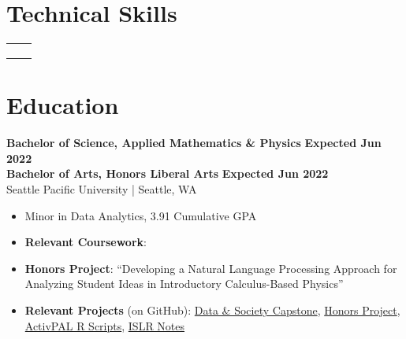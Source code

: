 \documentclass{article}
\begin{document}
\maketitle




\section{Technical Skills}
    \begin{flushleft}
        \begin{tabular}{>{\raggedleft\arraybackslash}p{1.25in} >{\raggedright\arraybackslash}p{5.85in}}
             \\
             \\
             \\
             \\
            
        \end{tabular}
    \end{flushleft}




\section{Education}

    \textbf{Bachelor of Science, Applied Mathematics \& Physics} \hfill \textbf{Expected Jun 2022}\\
    \textbf{Bachelor of Arts, Honors Liberal Arts} \hfill \textbf{Expected Jun 2022}\\
    Seattle Pacific University | Seattle, WA 
    \squish
    \begin{itemize}
        \item Minor in Data Analytics, 3.91 Cumulative GPA
        \item 
        \textbf{Relevant Coursework}: 
        \item 
        \textbf{Honors Project}: ``Developing a Natural Language Processing Approach for Analyzing Student Ideas in Introductory Calculus-Based Physics''
        \item \textbf{Relevant Projects} (on GitHub): \href{https://github.com/jonmgeiger/household-conditions}{Data \& Society Capstone}, \href{https://github.com/jonmgeiger/honors-project}{Honors Project}, \href{https://github.com/jonmgeiger/activPAL/tree/main/scripts_jon}{ActivPAL R Scripts}, \href{https://github.com/jonmgeiger/islr-notes}{ISLR Notes}
    \end{itemize}
\end{document}
